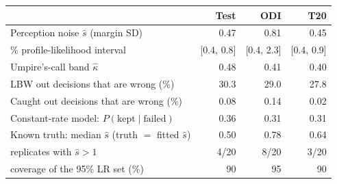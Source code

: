 \begin{tabular}{lrrr}
\toprule
 & Test & ODI & T20 \\
\midrule
Perception noise $\hat s$ (margin SD) & 0.47 & 0.81 & 0.45 \\
\quad 95\% profile-likelihood interval & [0.4, 0.8] & [0.4, 2.3] & [0.4, 0.9] \\
Umpire's-call band $\hat\kappa$ & 0.48 & 0.41 & 0.40 \\
LBW out decisions that are wrong (\%) & 30.3 & 29.0 & 27.8 \\
Caught out decisions that are wrong (\%) & 0.08 & 0.14 & 0.02 \\
Constant-rate model: $P(\text{kept}\mid\text{failed})$ & 0.36 & 0.31 & 0.31 \\
Known truth: median $\hat s$ (truth $=$ fitted $\hat s$) & 0.50 & 0.78 & 0.64 \\
\quad replicates with $\hat s>1$ & 4/20 & 8/20 & 3/20 \\
\quad coverage of the 95\% LR set (\%) & 90 & 95 & 90 \\
\bottomrule
\end{tabular}
